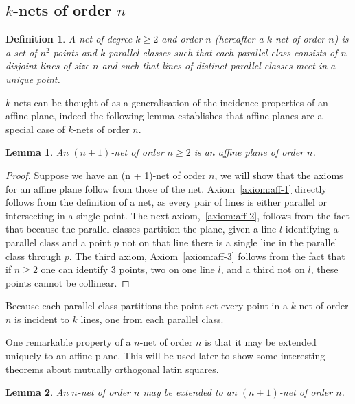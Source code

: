 \documentclass{article}
\newtheorem{lemma}{Lemma}
\newtheorem{definition}{Definition}
\begin{document}
\subsection{\(k\)-nets of order \(n\)}


\begin{definition}\label{def:net}
  A net of degree \(k \geq 2\) and order \(n\) (hereafter a \(k\)-net of order \(n\)) is a set of \(n^2\) points and \(k\) parallel classes such that each parallel class consists of \(n\)
  disjoint lines of size \(n\) and such that lines of distinct parallel classes meet in a unique point.
\end{definition}

\(k\)-nets can be thought of as a generalisation of the incidence properties of an affine plane, indeed the following lemma establishes that affine planes are a special case of \(k\)-nets of order \(n\).

\begin{lemma}
  An \((n + 1)\)-net of order \(n \geq 2\) is an affine plane of order \(n\).
\end{lemma}

\begin{proof}
  Suppose we have an (n + 1)-net of order \(n\), we will show that the axioms for an affine plane follow from those of the net.
  Axiom~\ref{axiom:aff-1} directly follows from the definition of a net, as every pair of lines is either parallel or intersecting in a single point. The next axiom,~\ref{axiom:aff-2}, follows from the fact that because the parallel classes partition the plane,
  given a line \(l\) identifying a parallel class and a point \(p\) not on that line there is a single line in the parallel class through \(p\). The third axiom, Axiom~\ref{axiom:aff-3} follows from the fact that if \(n \geq 2\) one can identify 3 points, two on one line \(l\), and a third not on \(l\), these points cannot be collinear.
\end{proof}

Because each parallel class partitions the point set every point in a \(k\)-net of order \(n\) is incident to \(k\) lines, one from each parallel class.

One remarkable property of a \(n\)-net of order \(n\) is that it may be extended uniquely to an affine plane. This will be used later to show some interesting theorems about mutually orthogonal latin squares.

\begin{lemma}\label{lemma:net-extension}
  An \(n\)-net of order \(n\) may be extended to an \((n + 1)\)-net of order \(n\).
\end{lemma}
\end{document}
